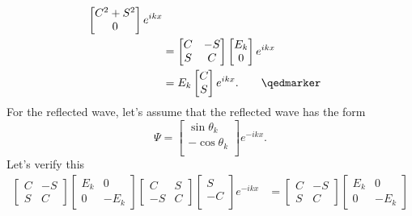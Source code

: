{\begin{equation}
\begin{aligned}
\begin{bmatrix}
C^2 + S^2 \\
0 \\
\end{bmatrix}
e^{i k x}
\\ &=
\begin{bmatrix}
C & - S \\
S & C
\end{bmatrix}
\begin{bmatrix}
E_k \\
0
\end{bmatrix}
e^{i k x}
\\ &=
E_k
\begin{bmatrix}
C \\
S
\end{bmatrix}
e^{i k x}. \qquad \qedmarker
\end{aligned}
\end{equation}
%
%
For the reflected wave, let's assume that the reflected wave has the form
%
\begin{equation}\label{eqn:qmLecture9Problems:680}
\Psi =
\begin{bmatrix}
\sin\theta_k \\
-\cos\theta_k \\
\end{bmatrix}
e^{-i k x }.
\end{equation}
%
Let's verify this
%
\begin{equation}\label{eqn:qmLecture9Problems:700}
\begin{aligned}
\begin{bmatrix}
C & - S \\
S & C
\end{bmatrix}
\begin{bmatrix}
E_k & 0 \\
0 & -E_k
\end{bmatrix}
\begin{bmatrix}
C & S \\
-S & C
\end{bmatrix}
\begin{bmatrix}
S \\
-C \\
\end{bmatrix}
e^{-i k x}
&=
\begin{bmatrix}
C & - S \\
S & C
\end{bmatrix}
\begin{bmatrix}
E_k & 0 \\
0 & -E_k
\end{bmatrix}

\end{aligned}
\end{equation}}
